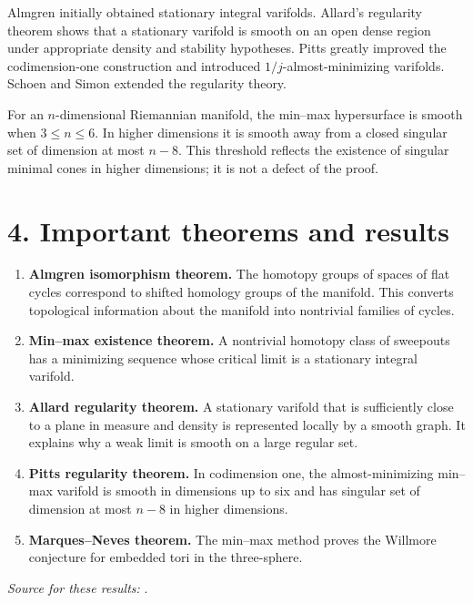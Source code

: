 Almgren initially obtained stationary integral varifolds. Allard's regularity theorem shows that a stationary varifold is smooth on an open dense region under appropriate density and stability hypotheses. Pitts greatly improved the codimension-one construction and introduced $1/j$-almost-minimizing varifolds. Schoen and Simon extended the regularity theory.

For an $n$-dimensional Riemannian manifold, the min--max hypersurface is smooth when $3\leq n\leq6$. In higher dimensions it is smooth away from a closed singular set of dimension at most $n-8$. This threshold reflects the existence of singular minimal cones in higher dimensions; it is not a defect of the proof.

\section*{4. Important theorems and results}
\begin{enumerate}[leftmargin=*,itemsep=0.35em]

\item \textbf{Almgren isomorphism theorem.} The homotopy groups of spaces of flat cycles correspond to shifted homology groups of the manifold. This converts topological information about the manifold into nontrivial families of cycles.

\item \textbf{Min--max existence theorem.} A nontrivial homotopy class of sweepouts has a minimizing sequence whose critical limit is a stationary integral varifold.

\item \textbf{Allard regularity theorem.} A stationary varifold that is sufficiently close to a plane in measure and density is represented locally by a smooth graph. It explains why a weak limit is smooth on a large regular set.

\item \textbf{Pitts regularity theorem.} In codimension one, the almost-minimizing min--max varifold is smooth in dimensions up to six and has singular set of dimension at most $n-8$ in higher dimensions.

\item \textbf{Marques--Neves theorem.} The min--max method proves the Willmore conjecture for embedded tori in the three-sphere.
\end{enumerate}
\noindent\emph{Source for these results:} \cite{almgren_pitts_min_max_theory_ref1}.

